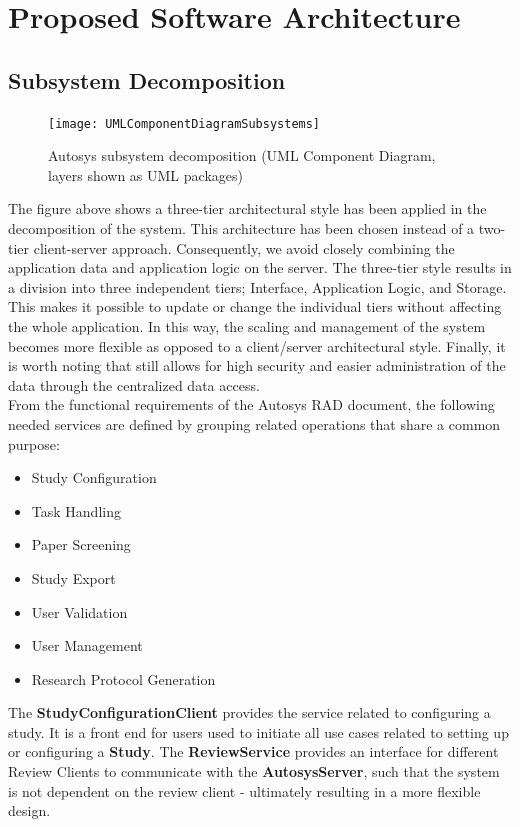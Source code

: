 \section{Proposed Software Architecture}
\subsection{Subsystem Decomposition}
\begin{figure}[H]
	\texttt{[image: UMLComponentDiagramSubsystems]}
	\caption{Autosys subsystem decomposition (UML Component Diagram, layers shown as UML packages)}
	\label{fig:Subsystem Decomposition, UML Component Diagram}
\end{figure}
The figure above shows a three-tier architectural style has been applied in the decomposition of the system. This architecture has been chosen instead of a two-tier client-server approach. Consequently, we avoid closely combining the application data and application logic on the server. The three-tier style results in a division into three independent tiers; Interface, Application Logic, and Storage. This makes it possible to update or change the individual tiers without affecting the whole application. In this way, the scaling and management of the system becomes more flexible as opposed to a client/server architectural style.
Finally, it is worth noting that still allows for high security and easier administration of the data through the centralized data access.\\
From the functional requirements of the Autosys RAD document, the following needed services are defined by grouping related operations that share a common purpose:\\
\begin{itemize}
	\item Study Configuration
	\item Task Handling
	\item Paper Screening
	\item Study Export
	\item User Validation
	\item User Management
	\item Research Protocol Generation
\end{itemize}
The \textbf{StudyConfigurationClient} provides the service related to configuring a study. It is a front end for users used to initiate all use cases related to setting up or configuring a \textbf{Study}.
The \textbf{ReviewService} provides an interface for different Review Clients to communicate with the \textbf{AutosysServer}, such that the system is not dependent on the review client - ultimately resulting in a more flexible design.
